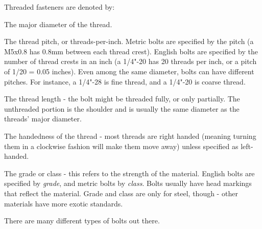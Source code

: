 \documentclass[10pt,letterpaper]{book}
\begin{document}
	Threaded fasteners are denoted by:
	\begin{asparaitem}
		\item The major diameter of the thread.
		\item The thread pitch, or threads-per-inch. Metric bolts are specified by the pitch (a M5x0.8 has 0.8mm between each thread crest). English bolts are specified by the number of thread crests in an inch (a 1/4"-20 has 20 threads per inch, or a pitch of 1/20 = 0.05 inches). Even among the same diameter, bolts can have different pitches. For instance, a 1/4"-28 is fine thread, and a 1/4"-20 is coarse thread.
		\item The thread length - the bolt might be threaded fully, or only partially. The unthreaded portion is the shoulder and is usually the same diameter as the threads' major diameter.
		\item The handedness of the thread - most threads are right handed (meaning turning them in a clockwise fashion will make them move away) unless specified as left-handed.
		\item The grade or class - this refers to the strength of the material. English bolts are specified by \textit{grade}, and metric bolts by \textit{class}. Bolts usually have head markings that reflect the material. Grade and class are only for steel, though - other materials have more exotic standards.
	\end{asparaitem}
	
	There are many different types of bolts out there.
	
\end{document}
